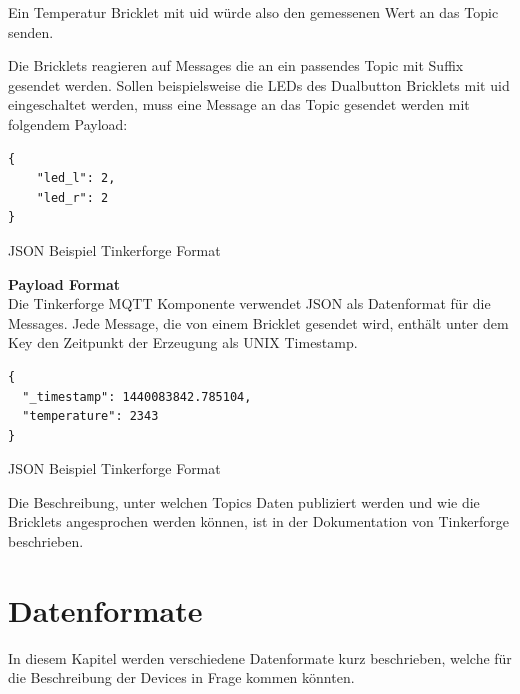 Ein Temperatur Bricklet mit \acrshort{uid}  würde also den gemessenen Wert an das Topic \\
 senden.

Die Bricklets reagieren auf Messages die an ein passendes Topic mit Suffix  gesendet werden. Sollen beispielsweise die LEDs des Dualbutton Bricklets mit \acrshort{uid}  eingeschaltet werden, muss eine Message an das Topic  gesendet werden mit folgendem Payload:

\begin{listing}[H]
\begin{verbatim}
{
    "led_l": 2,
    "led_r": 2
}
\end{verbatim}
\caption{JSON Beispiel Tinkerforge Format}
\end{listing}



\textbf{Payload Format} \\
Die Tinkerforge MQTT Komponente verwendet JSON als Datenformat für die Messages. Jede Message, die von einem Bricklet gesendet wird, enthält unter dem Key  den Zeitpunkt der Erzeugung als UNIX Timestamp.

\begin{listing}[H]
\begin{verbatim}
{
  "_timestamp": 1440083842.785104,
  "temperature": 2343
}
\end{verbatim}
\caption{JSON Beispiel Tinkerforge Format}
\end{listing}


Die Beschreibung, unter welchen Topics Daten publiziert werden und wie die Bricklets angesprochen werden können, ist in der Dokumentation von Tinkerforge \cite{tinkerf:mqtt} beschrieben.


\section{Datenformate}

In diesem Kapitel werden verschiedene Datenformate kurz beschrieben, welche für die Beschreibung der Devices in Frage kommen könnten. 

